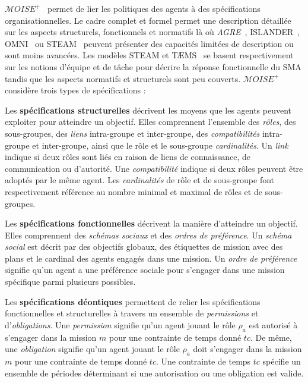 % 


$\mathcal{M}OISE^+$~\cite{Hubner2007} permet de lier les politiques des agents à des spécifications organisationnelles. %
Le cadre complet et formel permet une description détaillée sur les aspects structurels, fonctionnels et normatifs là où \emph{AGRE}~\cite{Ferber2004}, ISLANDER~\cite{Esteva2002}, OMNI~\cite{Dignum2005} ou STEAM~\cite{Tambe1999} peuvent présenter des capacités limitées de description ou sont moins avancées.
Les modèles STEAM et TÆMS~\cite{Vincent2000} se basent respectivement sur les notions d'équipe et de tâche pour décrire la réponse fonctionnelle du SMA tandis que les aspects normatifs et structurels sont peu couverts.
$\mathcal{M}OISE^+$ considère trois types de spécifications :

Les \textbf{spécifications structurelles} décrivent les moyens que les agents peuvent exploiter pour atteindre un objectif. Elles comprennent l'ensemble des \emph{rôles}, des sous-groupes, des \emph{liens} intra-groupe et inter-groupe, des \emph{compatibilités} intra-groupe et inter-groupe, ainsi que le rôle et le sous-groupe \emph {cardinalités}.
Un \emph{link} indique si deux rôles sont liés en raison de liens de connaissance, de communication ou d'autorité. Une \emph{compatibilité} indique si deux rôles peuvent être adoptés par le même agent. Les \emph{cardinalités} de rôle et de sous-groupe font respectivement référence au nombre minimal et maximal de rôles et de sous-groupes.

Les \textbf{spécifications fonctionnelles} décrivent la manière d'atteindre un objectif. Elles comprennent des \emph{schémas sociaux} et des \emph{ordres de préférence}. Un \emph{schéma social} est décrit par des objectifs globaux, des étiquettes de mission avec des plans et le cardinal des agents engagés dans une mission. Un \emph{ordre de préférence} signifie qu'un agent a une préférence sociale pour s'engager dans une mission spécifique parmi plusieurs possibles.

Les \textbf{spécifications déontiques} permettent de relier les spécifications fonctionnelles et structurelles à travers un ensemble de \emph{permissions} et d'\emph{obligations}. Une \emph{permission} signifie qu'un agent jouant le rôle $\rho_a$ est autorisé à s'engager dans la mission $m$ pour une contrainte de temps donné $tc$. De même, une \emph{obligation} signifie qu'un agent jouant le rôle $\rho_a$ doit s'engager dans la mission $m$ pour une contrainte de temps donné $tc$. Une contrainte de temps $tc $ spécifie un ensemble de périodes déterminant si une autorisation ou une obligation est valide.

